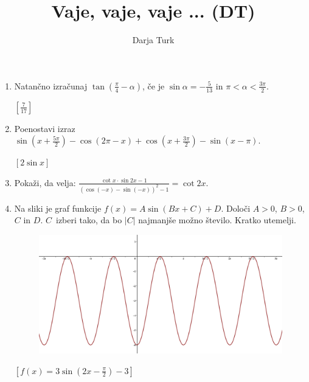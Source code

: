 \documentclass[11pt,a4paper]{article}
\title{Vaje, vaje, vaje ... (DT)}
\author{Darja Turk}
\date{}
\begin{document}
\maketitle

\begin{enumerate}
    \item Natančno izračunaj $\displaystyle \tan\left(\frac{\pi}{4}-\alpha\right)$, če je $\displaystyle \sin\alpha=-\frac{5}{13}$ in $\pi<\alpha<\frac{3\pi}{2}$.
        \begin{flushright}
            $\left[\frac{7}{17}\right]$
        \end{flushright}

    \item Poenostavi izraz $\displaystyle \sin\left(x+\frac{5\pi}{2}\right)-\cos\left(2\pi-x\right)+\cos\left(x+\frac{3\pi}{2}\right)-\sin\left(x-\pi\right)$.
        \begin{flushright}
            $\left[2\sin x\right]$
        \end{flushright}

    \item Pokaži, da velja: $\displaystyle \frac{\cot x\cdot\sin{2x}-1}{\left(\cos(-x)-\sin(-x)\right)^2-1}=\cot{2x}$.

    \item Na sliki je graf funkcije $\displaystyle f(x)=A\sin\left(Bx+C\right)+D$. Določi $A>0$, $B>0$, $C$ in $D$. $C$~izberi tako, da bo $|C|$ najmanjše možno število. Kratko utemelji.
        \begin{figure}[H]
            \centering
            \includegraphics[scale=0.4]{../Slike in skice/vaje_vaje_vaje_sinus.png}
        \end{figure}
        \begin{flushright}
            $\left[f(x)=3\sin\left(2x-\frac{\pi}{2}\right)-3\right]$
        \end{flushright}



\end{enumerate}
\end{document}
